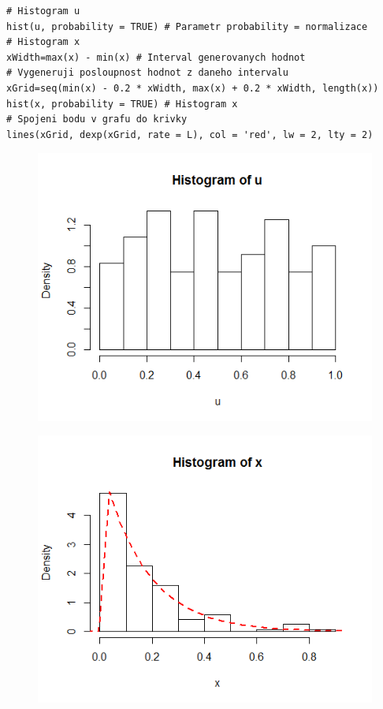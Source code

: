 \documentclass[a4paper]{article}
\begin{document}
\lstset{language = r, numbers=left, tabsize = 4, title=Řešení, basicstyle=\footnotesize}
\begin{lstlisting}[firstnumber=5]
# Histogram u
hist(u, probability = TRUE) # Parametr probability = normalizace
# Histogram x
xWidth=max(x) - min(x) # Interval generovanych hodnot
# Vygeneruji posloupnost hodnot z daneho intervalu
xGrid=seq(min(x) - 0.2 * xWidth, max(x) + 0.2 * xWidth, length(x))
hist(x, probability = TRUE) # Histogram x
# Spojeni bodu v grafu do krivky
lines(xGrid, dexp(xGrid, rate = L), col = 'red', lw = 2, lty = 2)
\end{lstlisting}

\begin{figure}[h]
\begin{center}
	\includegraphics{hist_u.png}
\end{center}
\end{figure}

\begin{figure}[h]
\begin{center}
	\includegraphics{hist_x.png}
\end{center}
\end{figure}
\end{document}

